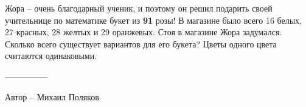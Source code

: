 \question
Жора -- очень благодарный ученик, и поэтому он решил подарить своей учительнице по математике букет из \textbf{91} розы! В магазине было всего 16 белых, 27 красных, 28 желтых и 29 оранжевых. Стоя в магазине Жора задумался. Сколько всего существует вариантов для его букета? Цветы одного цвета считаются одинаковыми.

---------------

Автор -- Михаил Поляков
